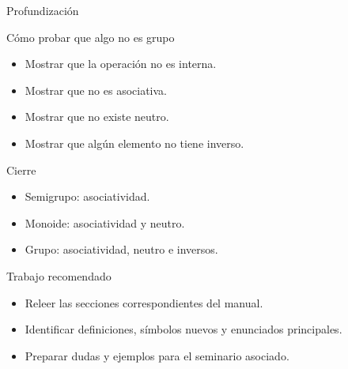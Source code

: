 \documentclass[aspectratio=169,11pt]{beamer}
\begin{document}
\begin{frame}{Profundización}
\begin{block}{Cómo probar que algo no es grupo}
\begin{itemize}
  \item Mostrar que la operación no es interna.
  \item Mostrar que no es asociativa.
  \item Mostrar que no existe neutro.
  \item Mostrar que algún elemento no tiene inverso.
\end{itemize}
\end{block}
\end{frame}

\begin{frame}{Cierre}
\begin{itemize}
  \item Semigrupo: asociatividad.
  \item Monoide: asociatividad y neutro.
  \item Grupo: asociatividad, neutro e inversos.
\end{itemize}
\end{frame}

\begin{frame}{Trabajo recomendado}
\begin{itemize}
  \item Releer las secciones correspondientes del manual.
  \item Identificar definiciones, símbolos nuevos y enunciados principales.
  \item Preparar dudas y ejemplos para el seminario asociado.
\end{itemize}
\end{frame}
\end{document}
